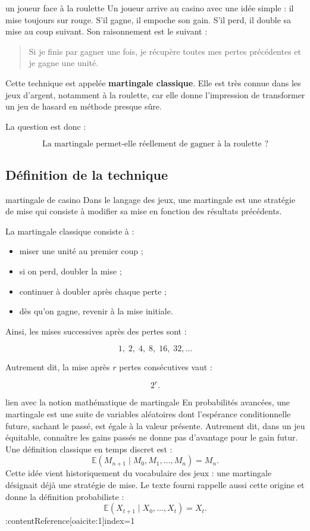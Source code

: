 \documentclass[11pt,a4paper]{article}
\begin{document}
\begin{contexte}{un joueur face à la roulette}
Un joueur arrive au casino avec une idée simple : il mise toujours sur rouge. S'il gagne, il empoche son gain. S'il perd, il double sa mise au coup suivant. Son raisonnement est le suivant :

\begin{quote}
    \og Si je finis par gagner une fois, je récupère toutes mes pertes précédentes et je gagne une unité. \fg{}
\end{quote}

Cette technique est appelée \textbf{martingale classique}. Elle est très connue dans les jeux d'argent, notamment à la roulette, car elle donne l'impression de transformer un jeu de hasard en méthode presque sûre.

La question est donc :

\[
\text{La martingale permet-elle réellement de gagner à la roulette ?}
\]
\end{contexte}

\subsection{Définition de la technique}

\begin{definitionbox}{martingale de casino}
Dans le langage des jeux, une martingale est une stratégie de mise qui consiste à modifier sa mise en fonction des résultats précédents.

La martingale classique consiste à :
\begin{itemize}
    \item miser une unité au premier coup ;
    \item si on perd, doubler la mise ;
    \item continuer à doubler après chaque perte ;
    \item dès qu'on gagne, revenir à la mise initiale.
\end{itemize}

Ainsi, les mises successives après des pertes sont :

\[
1,\;2,\;4,\;8,\;16,\;32,\dots
\]

Autrement dit, la mise après \(r\) pertes consécutives vaut :

\[
2^r.
\]
\end{definitionbox}

\begin{prepa}{lien avec la notion mathématique de martingale}
En probabilités avancées, une martingale est une suite de variables aléatoires dont l'espérance conditionnelle future, sachant le passé, est égale à la valeur présente. Autrement dit, dans un jeu équitable, connaître les gains passés ne donne pas d'avantage pour le gain futur. Une définition classique en temps discret est :
\[
\mathbb{E}(M_{n+1}\mid M_0,M_1,\dots,M_n)=M_n.
\]
Cette idée vient historiquement du vocabulaire des jeux : une martingale désignait déjà une stratégie de mise. Le texte fourni rappelle aussi cette origine et donne la définition probabiliste :
\[
\mathbb{E}(X_{t+1}\mid X_0,\dots,X_t)=X_t.
\]
:contentReference[oaicite:1]{index=1}
\end{prepa}
\end{document}

